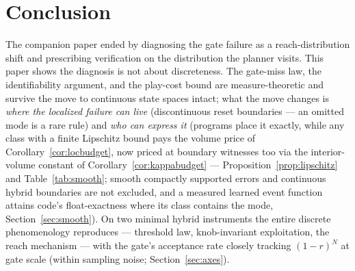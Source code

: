 \documentclass[11pt]{article}
\theoremstyle{definition}
\theoremstyle{remark}
\begin{document}
\section{Conclusion}
\label{sec:conclusion}

The companion paper ended by diagnosing the gate failure as a reach-distribution shift and prescribing verification on the distribution the planner visits. This paper shows the diagnosis is not about discreteness. The gate-miss law, the identifiability argument, and the play-cost bound are measure-theoretic and survive the move to continuous state spaces intact; what the move changes is \emph{where the localized failure can live} (discontinuous reset boundaries --- an omitted mode is a rare rule) and \emph{who can express it} (programs place it exactly, while any class with a finite Lipschitz bound pays the volume price of Corollary~\ref{cor:locbudget}, now priced at boundary witnesses too via the interior-volume constant of Corollary~\ref{cor:kappabudget} --- Proposition~\ref{prop:lipschitz} and Table~\ref{tab:smooth}; smooth compactly supported errors and continuous hybrid boundaries are not excluded, and a measured learned event function attains code's float-exactness where its class contains the mode, Section~\ref{sec:smooth}). On two minimal hybrid instruments the entire discrete phenomenology reproduces --- threshold law, knob-invariant exploitation, the reach mechanism --- with the gate's acceptance rate closely tracking $(1-r)^N$ at gate scale (within sampling noise; Section~\ref{sec:axes}).
\end{document}
